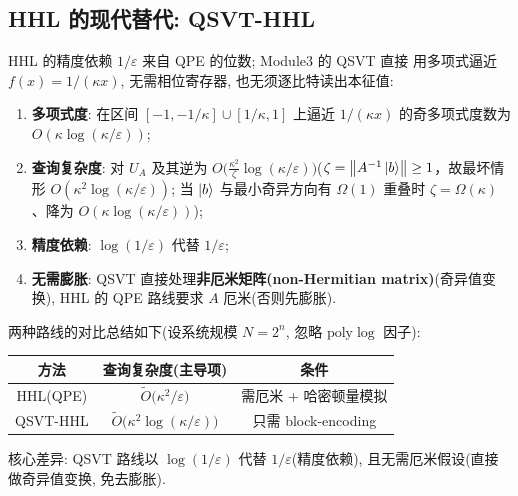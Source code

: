 \documentclass[utf8]{article} %
\numberwithin{equation}{section}   %
\newtheorem{Note}{\hskip 2em {\color{red} 注}}[subsection]
\begin{document}
\subsection{HHL 的现代替代: QSVT-HHL}

\begin{Note}
    HHL 的精度依赖 $1/\varepsilon$ 来自 QPE 的位数; Module3 的 QSVT 直接
    用多项式逼近 $f(x) = 1/(\kappa x)$, 无需相位寄存器, 也无须逐比特读出本征值:
    \begin{enumerate}
        \item \textbf{多项式度}: 在区间 $[-1,-1/\kappa]\cup[1/\kappa,1]$ 上逼近
        $1/(\kappa x)$ 的奇多项式度数为 $O(\kappa\log(\kappa/\varepsilon))$;
        \item \textbf{查询复杂度}: 对 $U_A$ 及其逆为
        $O\!\big(\frac{\kappa^2}{\zeta}\log(\kappa/\varepsilon)\big)$($\zeta=\norm{A^{-1}\ket{b}}\ge1$，故最坏情形 $O(\kappa^2\log(\kappa/\varepsilon))$; 当 $\ket{b}$ 与最小奇异方向有 $\Omega(1)$ 重叠时 $\zeta=\Omega(\kappa)$、降为 $O(\kappa\log(\kappa/\varepsilon))$);
        \item \textbf{精度依赖}: $\log(1/\varepsilon)$ 代替 $1/\varepsilon$;
        \item \textbf{无需膨胀}: QSVT 直接处理\textbf{非厄米矩阵(non-Hermitian matrix)}(奇异值变换),
        HHL 的 QPE 路线要求 $A$ 厄米(否则先膨胀).
    \end{enumerate}
    两种路线的对比总结如下(设系统规模 $N = 2^n$, 忽略 $\mathrm{poly}\log$ 因子):
    \begin{center}
    \begin{tabular}{ccc}
        \toprule
        方法 & 查询复杂度(主导项) & 条件 \\
        \midrule
        HHL(QPE) & $\tilde O\big(\kappa^2/\varepsilon\big)$ & 需厄米 + 哈密顿量模拟 \\
        QSVT-HHL & $\tilde O\big(\kappa^2\log(\kappa/\varepsilon)\big)$ & 只需 block-encoding \\
        \bottomrule
    \end{tabular}
    \end{center}
    核心差异: QSVT 路线以 $\log(1/\varepsilon)$ 代替 $1/\varepsilon$(精度依赖),
    且无需厄米假设(直接做奇异值变换, 免去膨胀).
\end{Note}
\end{document}
